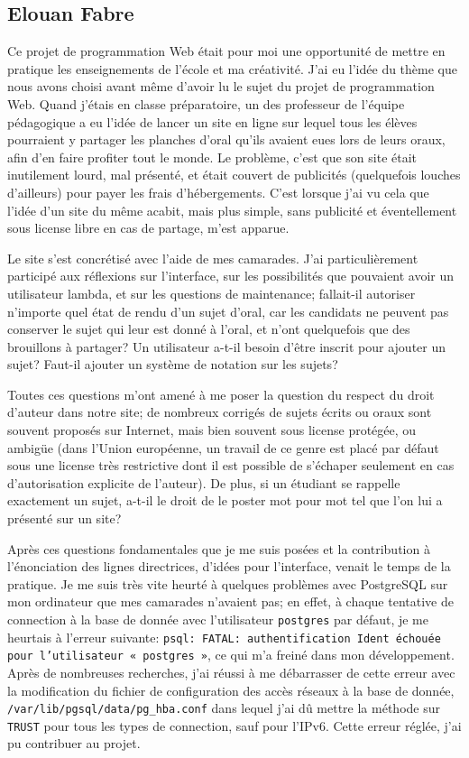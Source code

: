 \documentclass{article}
\begin{document}
\subsection*{Elouan Fabre}

Ce projet de programmation Web était pour moi une opportunité de mettre en pratique les enseignements de l'école et ma créativité. J'ai eu l'idée du thème que nous avons choisi avant même d'avoir lu le sujet du projet de programmation Web. Quand j'étais en classe préparatoire, un des professeur de l'équipe pédagogique a eu l'idée de lancer un site en ligne sur lequel tous les élèves pourraient y partager les planches d'oral qu'ils avaient eues lors de leurs oraux, afin d'en faire profiter tout le monde. Le problème, c'est que son site était inutilement lourd, mal présenté, et était couvert de publicités (quelquefois louches d'ailleurs) pour payer les frais d'hébergements. C'est lorsque j'ai vu cela que l'idée d'un site du même acabit, mais plus simple, sans publicité et éventellement sous license libre en cas de partage, m'est apparue.

Le site s'est concrétisé avec l'aide de mes camarades. J'ai particulièrement participé aux réflexions sur l'interface, sur les possibilités que pouvaient avoir un utilisateur lambda, et sur les questions de maintenance; fallait-il autoriser n'importe quel état de rendu d'un sujet d'oral, car les candidats ne peuvent pas conserver le sujet qui leur est donné à l'oral, et n'ont quelquefois que des brouillons à partager? Un utilisateur a-t-il besoin d'être inscrit pour ajouter un sujet? Faut-il ajouter un système de notation sur les sujets?

Toutes ces questions m'ont amené à me poser la question du respect du droit d'auteur dans notre site; de nombreux corrigés de sujets écrits ou oraux sont souvent proposés sur Internet, mais bien souvent sous license protégée, ou ambigüe (dans l'Union européenne, un travail de ce genre est placé par défaut sous une license très restrictive dont il est possible de s'échaper seulement en cas d'autorisation explicite de l'auteur). De plus, si un étudiant se rappelle exactement un sujet, a-t-il le droit de le poster mot pour mot tel que l'on lui a présenté sur un site?

Après ces questions fondamentales que je me suis posées et la contribution à l'énonciation des lignes directrices, d'idées pour l'interface, venait le temps de la pratique. Je me suis très vite heurté à quelques problèmes avec PostgreSQL sur mon ordinateur que mes camarades n’avaient pas; en effet, à chaque tentative de connection à la base de donnée avec l'utilisateur \texttt{postgres} par défaut, je me heurtais à l'erreur suivante: \texttt{psql: FATAL:  authentification Ident échouée pour l'utilisateur « postgres »}, ce qui m'a freiné dans mon développement. Après de nombreuses recherches, j'ai réussi à me débarrasser de cette erreur avec la modification du fichier de configuration des accès réseaux à la base de donnée, \texttt{/var/lib/pgsql/data/pg\_hba.conf} dans lequel j'ai dû mettre la méthode sur \texttt{TRUST} pour tous les types de connection, sauf pour l'IPv6. Cette erreur réglée, j'ai pu contribuer au projet.
\end{document}
